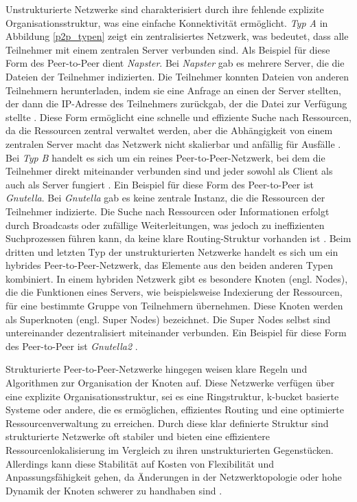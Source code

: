 Unstrukturierte Netzwerke sind charakterisiert durch ihre fehlende explizite Organisationsstruktur, was eine einfache Konnektivität ermöglicht. \textit{Typ A} in Abbildung \ref{p2p_typen} zeigt ein zentralisiertes Netzwerk, was bedeutet, dass alle Teilnehmer mit einem zentralen Server verbunden sind. Als Beispiel für diese Form des Peer-to-Peer dient \textit{Napster}. Bei \textit{Napster} gab es mehrere Server, die die Dateien der Teilnehmer indizierten. Die Teilnehmer konnten Dateien von anderen Teilnehmern herunterladen, indem sie eine Anfrage an einen der Server stellten, der dann die IP-Adresse des Teilnehmers zurückgab, der die Datei zur Verfügung stellte \parencite[S. 171]{Saroiu_MeasuringAndAnalyzingNapsterAndGnutellaHosts}. Diese Form ermöglicht eine schnelle und effiziente Suche nach Ressourcen, da die Ressourcen zentral verwaltet werden, aber die Abhängigkeit von einem zentralen Server macht das Netzwerk nicht skalierbar und anfällig für Ausfälle \parencite[S. 732]{Khatibi_StructuredUnstructuredP2P}.
Bei \textit{Typ B} handelt es sich um ein reines Peer-to-Peer-Netzwerk, bei dem die Teilnehmer direkt miteinander verbunden sind und jeder sowohl als Client als auch als Server fungiert \parencite[S. 732]{Khatibi_StructuredUnstructuredP2P}. Ein Beispiel für diese Form des Peer-to-Peer ist \textit{Gnutella}. Bei \textit{Gnutella} gab es keine zentrale Instanz, die die Ressourcen der Teilnehmer indizierte. Die Suche nach Ressourcen oder Informationen erfolgt durch Broadcasts oder zufällige Weiterleitungen, was jedoch zu ineffizienten Suchprozessen führen kann, da keine klare Routing-Struktur vorhanden ist \parencite[S. 171]{Saroiu_MeasuringAndAnalyzingNapsterAndGnutellaHosts}. Beim dritten und letzten Typ der unstrukturierten Netzwerke handelt es sich um ein hybrides Peer-to-Peer-Netzwerk, das Elemente aus den beiden anderen Typen kombiniert. In einem hybriden Netzwerk gibt es besondere Knoten (engl. Nodes), die die Funktionen eines Servers, wie beispielsweise Indexierung der Ressourcen, für eine bestimmte Gruppe von Teilnehmern übernehmen. Diese Knoten werden als Superknoten (engl. Super Nodes) bezeichnet. Die Super Nodes selbst sind untereinander dezentralisiert miteinander verbunden. Ein Beispiel für diese Form des Peer-to-Peer ist \textit{Gnutella2} \parencite[S. 732]{Khatibi_StructuredUnstructuredP2P}. 

Strukturierte Peer-to-Peer-Netzwerke hingegen weisen klare Regeln und Algorithmen zur Organisation der Knoten auf. Diese Netzwerke verfügen über eine explizite Organisationsstruktur, sei es eine Ringstruktur, k-bucket basierte Systeme oder andere, die es ermöglichen, effizientes Routing und eine optimierte Ressourcenverwaltung zu erreichen. Durch diese klar definierte Struktur sind strukturierte Netzwerke oft stabiler und bieten eine effizientere Ressourcenlokalisierung im Vergleich zu ihren unstrukturierten Gegenstücken. Allerdings kann diese Stabilität auf Kosten von Flexibilität und Anpassungsfähigkeit gehen, da Änderungen in der Netzwerktopologie oder hohe Dynamik der Knoten schwerer zu handhaben sind \parencite[S. 40]{Vu_P2PComputing}.


